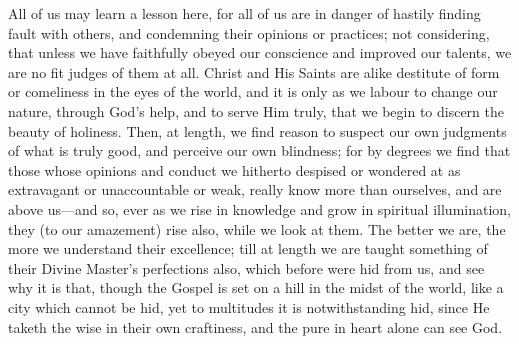 All of us may learn a lesson here, for all of us are in danger of
hastily finding fault with others, and condemning their opinions or
practices; not considering, that unless we have faithfully obeyed our
conscience and improved our talents, we are no fit judges of them at
all. Christ and His Saints are alike destitute of form or comeliness
in the eyes of the world, and it is only as we labour to change our
nature, through God's help, and to serve Him truly, that we begin to
discern the beauty of holiness. Then, at length, we find reason to
suspect our own judgments of what is truly good, and perceive our own
blindness; for by degrees we find that those whose opinions and
conduct we hitherto despised or wondered at as extravagant or
unaccountable or weak, really know more than ourselves, and are above
us—and so, ever as we rise in knowledge and grow in spiritual
illumination, they (to our amazement) rise also, while we look at
them. The better we are, the more we understand their excellence; till
at length we are taught something of their Divine Master's perfections
also, which before were hid from us, and see why it is that, though
the Gospel is set on a hill in the midst of the world, like a city
which cannot be hid, yet to multitudes it is notwithstanding hid,
since He taketh the wise in their own craftiness, and the pure in
heart alone can see God.

